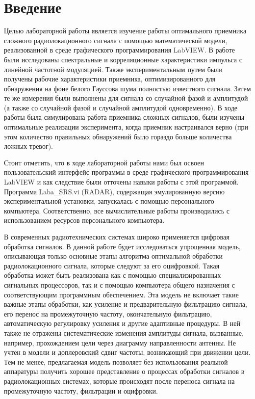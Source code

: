 


\def\labauthors{Виноградов И.Д., Понур К.А., Шиков А.П.}
\def\labgroup{0420ДМР1Г}
\def\labnumber{1}
\def\labtheme{Исследование рабочих характеристик оптимального обнаружителя сложных радиолокационных сигналов.}



\section{Введение}
Целью лабораторной работы является изучение работы оптимального приемника сложного
радиолокационного сигнала с помощью математической модели, реализованной в среде графического
программирования LabVIEW. В работе были исследованы спектральные и корреляционные
характеристики импульса с линейной частотной модуляцией. Также экспериментальным путем
были получены рабочие характеристики приемника, оптимизированного для обнаружения на
фоне белого Гауссова шума полностью известного сигнала. Затем те же измерения были
выполнены для сигнала со случайной фазой и амплитудой (а также со случайной фазой
и случайной амплитудой одновременно). В ходе работы была симулирована работа приемника
сложных сигналов, были изучены оптимальные реализации эксперимента, когда приемник
настраивался верно (при этом количество правильных обнаружений было гораздо больше
количества ложных тревог).

Стоит отметить, что в ходе лабораторной работы нами был освоен пользовательский интерфейс
программы в среде графического программирования LabVIEW и как следствие были отточены
навыки работы с этой программой. Программа Laba\_SRS.vi (RADAR), содержащая эмулированную версию
экспериментальной установки, запускалась с помощью персонального компьютера.
Соответственно, все вычислительные работы производились с использованием ресурсов
персонального компьютера.

В современных радиотехнических системах широко применяется цифровая обработка сигналов.
В данной работе будет исследоваться упрощенная модель, описывающая только основные этапы
алгоритма оптимальной обработки радиолокационного сигнала, которые следуют за его
оцифровкой. Такая обработка может быть реализована как с помощью специализированных
сигнальных процессоров, так и с помощью компьютера общего назначения с соответствующим
программным обеспечением. Эта модель не включает такие важные этапы обработки,
как усиление и предварительную фильтрацию сигнала, его перенос на промежуточную
частоту, окончательную фильтрацию, автоматическую регулировку усиления и другие
адаптивные процедуры. В ней также не отражены систематические изменения амплитуды
сигнала, вызванные, например, прохождением цели через диаграмму направленности
антенны. Не учтен в модели и доплеровский сдвиг частоты, возникающий при движении
цели. Тем не менее, предлагаемая модель позволяет без использования реальной
аппаратуры получить хорошее представление о процессах обработки сигналов в
радиолокационных системах, которые происходят после переноса сигнала на
промежуточную частоту, фильтрации и оцифровки.


